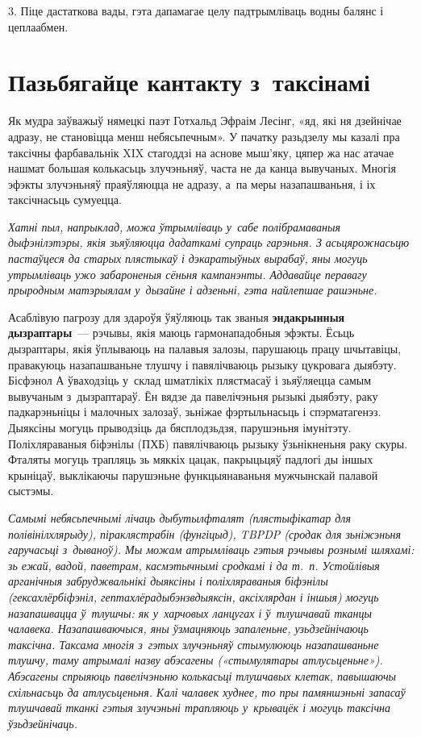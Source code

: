 3. Піце дастаткова вады, гэта дапамагае целу падтрымліваць водны балянс і цеплаабмен.


\section{Пазьбягайце кантакту з~таксінамі}

Як мудра заўважыў нямецкі паэт Готхальд Эфраім Лесінг, «яд, які ня дзейнічае адразу, не становіцца менш небясьпечным». У пачатку разьдзелу мы казалі пра таксічны фарбавальнік XIX стагоддзі на аснове мыш'яку, цяпер жа нас атачае нашмат большая колькасьць злучэньняў, часта не да канца вывучаных. Многія эфэкты злучэньняў праяўляюцца не адразу, а~па меры назапашваньня, і іх таксічнасьць сумуецца.

\emph{Хатні пыл, напрыклад, можа ўтрымліваць у~сабе полібрамаваныя дыфэнілэтэры, якія зьяўляюцца дадаткамі супраць гарэньня. З асьцярожнасьцю пастаўцеся да старых плястыкаў і дэкаратыўных вырабаў, яны могуць утрымліваць ужо забароненыя сёньня кампанэнты. Аддавайце перавагу прыродным матэрыялам у~дызайне і адзеньні, гэта найлепшае рашэньне.}

Асаблівую пагрозу для здароўя ўяўляюць так званыя \textbf{эндакрынныя дызраптары}~--- рэчывы, якія маюць гармонападобныя эфэкты. Ёсьць дызраптары, якія ўплываюць на палавыя залозы, парушаюць працу шчытавіцы, правакуюць назапашваньне тлушчу і павялічваюць рызыку цукровага дыябэту. Бісфэнол А ўваходзіць у~склад шматлікіх плястмасаў і зьяўляецца самым вывучаным з~дызраптараў. Ён вядзе да павелічэньня рызыкі дыябэту, раку падкарэньніцы і малочных залозаў, зьніжае фэртыльнасьць і спэрматагенэз. Дыяксіны могуць прыводзіць да бясплодзьдзя, парушэньня імунітэту. Поліхляраваныя біфэнілы (ПХБ) павялічваюць рызыку ўзьнікненьня раку скуры. Фталяты могуць трапляць зь мяккіх цацак, пакрыцьцяў падлогі ды іншых крыніцаў, выклікаючы парушэньне функцыянаваньня мужчынскай палавой сыстэмы.

\emph{Самымі небясьпечнымі лічаць дыбутылфталят (плястыфікатар для полівінілхлярыду), піраклястрабін (фунгіцыд), TBPDP (сродак для зьніжэньня гаручасьці з~дываноў). Мы можам атрымліваць гэтыя рэчывы рознымі шляхамі: зь ежай, вадой, паветрам, касмэтычнымі сродкамі і да т.~п. Устойлівыя арганічныя забруджвальнікі дыяксіны і поліхляраваныя біфэнілы (гексахлёрбіфэніл, гептахлёрадыбэнзвдыяксін, аксіхлярдан і іншыя) могуць назапашвацца ў~тлушчы: як у~харчовых ланцугах і ў~тлушчавай тканцы чалавека. Назапашваючыся, яны ўзмацняюць запаленьне, узьдзейнічаюць таксічна. Таксама многія з~гэтых злучэньняў стымулююць назапашваньне тлушчу, таму атрымалі назву абэсагены («стымулятары атлусьценьне»). Абэсагены спрыяюць павелічэньню колькасьці тлушчавых клетак, павышаючы схільнасьць да атлусьценьня. Калі чалавек худнее, то пры памяншэньні запасаў тлушчавай тканкі гэтыя злучэньні трапляюць у~крывацёк і могуць таксічна ўзьдзейнічаць.}

